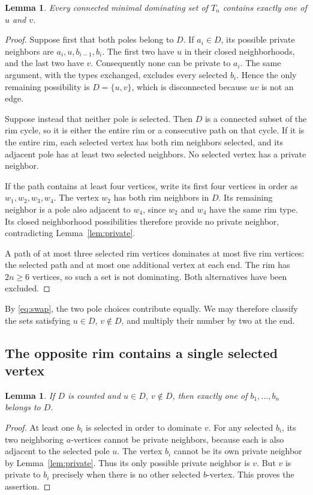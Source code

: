 \documentclass[11pt,letterpaper]{article}
\numberwithin{equation}{section}
\newtheorem{lemma}[theorem]{Lemma}
\theoremstyle{definition}
\theoremstyle{remark}
\begin{document}
\begin{lemma}\label{lem:poles}
Every connected minimal dominating set of $T_n$ contains exactly one
of $u$ and $v$.
\end{lemma}
\begin{proof}
Suppose first that both poles belong to $D$. If $a_i\in D$, its
possible private neighbors are $a_i,u,b_{i-1},b_i$. The first two
have $u$ in their closed neighborhoods, and the last two have $v$.
Consequently none can be private to $a_i$. The same argument, with
the types exchanged, excludes every selected $b_i$. Hence the only
remaining possibility is $D=\{u,v\}$, which is disconnected because
$uv$ is not an edge.

Suppose instead that neither pole is selected. Then $D$ is a connected
subset of the rim cycle, so it is either the entire rim or a consecutive
path on that cycle. If it is the entire rim, each selected vertex has
both rim neighbors selected, and its adjacent pole has at least two
selected neighbors. No selected vertex has a private neighbor.

If the path contains at least four vertices, write its first four
vertices in order as $w_1,w_2,w_3,w_4$. The vertex $w_2$ has both rim
neighbors in $D$. Its remaining neighbor is a pole also adjacent to
$w_4$, since $w_2$ and $w_4$ have the same rim type. Its closed
neighborhood possibilities therefore provide no private neighbor,
contradicting Lemma~\ref{lem:private}.

A path of at most three selected rim vertices dominates at most five
rim vertices: the selected path and at most one additional vertex at
each end. The rim has $2n\ge6$ vertices, so such a set is not
dominating. Both alternatives have been excluded.
\end{proof}

By \eqref{eq:swap}, the two pole choices contribute equally. We may
therefore classify the sets satisfying $u\in D$, $v\notin D$, and
multiply their number by two at the end.

\subsection{The opposite rim contains a single selected vertex}

\begin{lemma}\label{lem:singleb}
If $D$ is counted and $u\in D$, $v\notin D$, then exactly one of
$b_1,\ldots,b_n$ belongs to $D$.
\end{lemma}
\begin{proof}
At least one $b_i$ is selected in order to dominate $v$. For any
selected $b_i$, its two neighboring $a$-vertices cannot be private
neighbors, because each is also adjacent to the selected pole $u$.
The vertex $b_i$ cannot be its own private neighbor by
Lemma~\ref{lem:private}. Thus its only possible private neighbor is $v$.
But $v$ is private to $b_i$ precisely when there is no other selected
$b$-vertex. This proves the assertion.
\end{proof}
\end{document}
